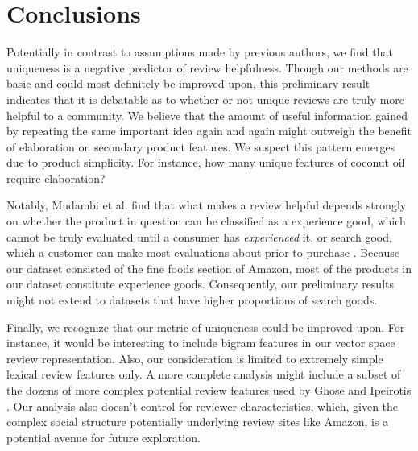 \documentclass[10pt]{article}
\begin{document}
\section*{Conclusions}
Potentially in contrast to assumptions made by previous authors, we find that uniqueness is a negative predictor of review helpfulness. Though our methods are basic and could most definitely be improved upon, this preliminary result indicates that it is debatable as to whether or not unique reviews are truly more helpful to a community. We believe that the amount of useful information gained by repeating the same important idea again and again might outweigh the benefit of elaboration on secondary product features. We suspect this pattern emerges due to product simplicity. For instance, how many unique features of coconut oil require elaboration?

Notably, Mudambi et al. find that what makes a review helpful depends strongly on whether the product in question can be classified as a experience good, which cannot be truly evaluated until a consumer has \emph{experienced} it, or search good, which a customer can make most evaluations about prior to purchase \cite{mudambi2010makes}. Because our dataset consisted of the fine foods section of Amazon, most of the products in our dataset constitute experience goods. Consequently, our preliminary results might not extend to datasets that have higher proportions of search goods.

Finally, we recognize that our metric of uniqueness could be improved upon. For instance, it would be interesting to include bigram features in our vector space review representation. Also, our consideration is limited to extremely simple lexical review features only. A more complete analysis might include a subset of the dozens of more complex potential review features used by Ghose and Ipeirotis \cite{ghose2011estimating}. Our analysis also doesn't control for reviewer characteristics, which, given the complex social structure potentially underlying review sites like Amazon, is a potential avenue for future exploration.


\end{document}
